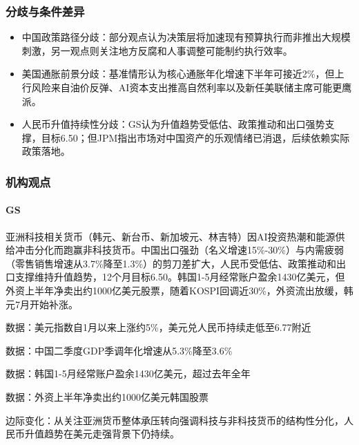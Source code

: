 \documentclass[11pt]{ctexart}
\begin{document}
\subsubsection*{分歧与条件差异}
\begin{itemize}
  \item 中国政策路径分歧：部分观点认为决策层将加速现有预算执行而非推出大规模刺激，另一观点则关注地方反腐和人事调整可能制约执行效率。
  \item 美国通胀前景分歧：基准情形认为核心通胀年化增速下半年可接近2\%，但上行风险来自油价反弹、AI资本支出推高自然利率以及新任美联储主席可能更鹰派。
  \item 人民币升值持续性分歧：GS认为升值趋势受低估、政策推动和出口强势支撑，目标6.50；但JPM指出市场对中国资产的乐观情绪已消退，后续依赖实际政策落地。
\end{itemize}
\subsubsection*{机构观点}
\paragraph{GS} 亚洲科技相关货币（韩元、新台币、新加坡元、林吉特）因AI投资热潮和能源供给冲击分化而跑赢非科技货币。中国出口强劲（名义增速15\%-30\%）与内需疲弱（零售销售增速从3.7\%降至1.3\%）的剪刀差扩大，人民币受低估、政策推动和出口支撑维持升值趋势，12个月目标6.50。韩国1-5月经常账户盈余1430亿美元，但外资上半年净卖出约1000亿美元股票，随着KOSPI回调近30\%，外资流出放缓，韩元7月开始补涨。
{\small\color{refgray}数据：美元指数自1月以来上涨约5\%，美元兑人民币持续走低至6.77附近\par}
{\small\color{refgray}数据：中国二季度GDP季调年化增速从5.3\%降至3.6\%\par}
{\small\color{refgray}数据：韩国1-5月经常账户盈余1430亿美元，超过去年全年\par}
{\small\color{refgray}数据：外资上半年净卖出约1000亿美元韩国股票\par}
{\small\color{refgray}边际变化：从关注亚洲货币整体承压转向强调科技与非科技货币的结构性分化，人民币升值趋势在美元走强背景下仍持续。\par}
\end{document}
